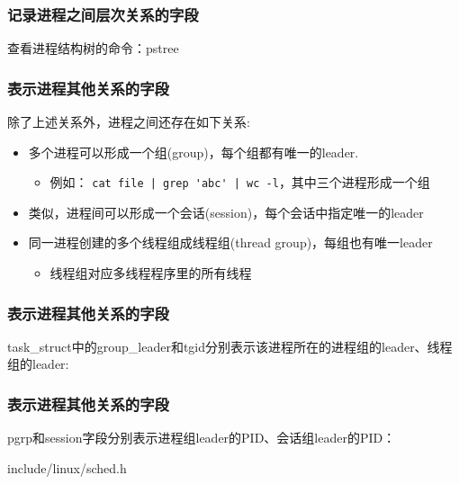 \documentclass[xcolor=svgnames]{beamer}
\begin{document}
\begin{CJK*}{UTF8}{gbsn}
\begin{frame}[fragile]
\frametitle{记录进程之间层次关系的字段}
查看进程结构树的命令：pstree
\end{frame}

\begin{frame}[fragile]
\frametitle{表示进程其他关系的字段}
除了上述关系外，进程之间还存在如下关系:
\begin{itemize}
\item 多个进程可以形成一个组(group)，每个组都有唯一的leader.
\begin{itemize}
\item 例如： \verb=cat file | grep 'abc' | wc -l=，其中三个进程形成一个组
\end{itemize}
\item 类似，进程间可以形成一个会话(session)，每个会话中指定唯一的leader
\item 同一进程创建的多个线程组成线程组(thread group)，每组也有唯一leader
\begin{itemize}
\item 线程组对应多线程程序里的所有线程
\end{itemize}
\end{itemize}
\end{frame}

\begin{frame}[fragile]
\frametitle{表示进程其他关系的字段}
task\_struct中的group\_leader和tgid分别表示该进程所在的进程组的leader、线程组的leader:

\lstotherrelations
\end{frame}

\begin{frame}[fragile]
\frametitle{表示进程其他关系的字段}
pgrp和session字段分别表示进程组leader的PID、会话组leader的PID：
\begin{block}{include/linux/sched.h}
\lstsignalstruct
\end{block}
\end{frame}


\end{CJK*}
\end{document}
